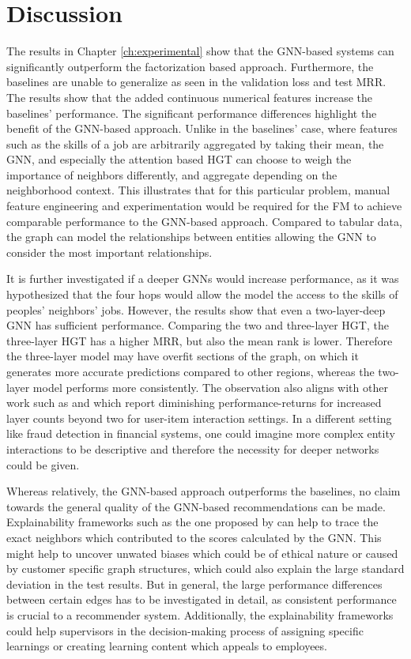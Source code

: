 
\chapter{Discussion}
\label{ch:discussion}
The results in Chapter \ref{ch:experimental} show that the GNN-based systems can significantly outperform the factorization based approach. Furthermore, the baselines are unable to generalize as seen in the validation loss and test MRR. The results show that the added continuous numerical features increase the baselines' performance. The significant performance differences highlight the benefit of the GNN-based approach. Unlike in the baselines' case, where features such as the skills of a job are arbitrarily aggregated by taking their mean, the GNN, and especially the attention based HGT can choose to weigh the importance of neighbors differently, and aggregate depending on the neighborhood context. This illustrates that for this particular problem, manual feature engineering and experimentation would be required for the FM to achieve comparable performance to the GNN-based approach. Compared to tabular data, the graph can model the relationships between entities allowing the GNN to consider the most important relationships. 

It is further investigated if a deeper GNNs would increase performance, as it was hypothesized that the four hops would allow the model the access to the skills of peoples' neighbors' jobs. However, the results show that even a two-layer-deep GNN has sufficient performance. Comparing the two and three-layer HGT, the three-layer HGT has a higher MRR, but also the mean rank is lower. Therefore the three-layer model may have overfit sections of the graph, on which it generates more accurate predictions compared to other regions, whereas the two-layer model performs more consistently. The observation also aligns with other work such as \parencite{ying2018graph} and \parencite{hamilton2017inductive} which report diminishing performance-returns for increased layer counts beyond two for user-item interaction settings. In a different setting like fraud detection in financial systems, one could imagine more complex entity interactions to be descriptive and therefore the necessity for deeper networks could be given. 

Whereas relatively, the GNN-based approach outperforms the baselines, no claim towards the general quality of the GNN-based recommendations can be made. Explainability frameworks such as the one proposed by \textcite{amara2022graphframex} can help to trace the exact neighbors which contributed to the scores calculated by the GNN. This might help to uncover unwated biases which could be of ethical nature or caused by customer specific graph structures, which could also explain the large standard deviation in the test results. But in general, the large performance differences between certain edges has to be investigated in detail, as consistent performance is crucial to a recommender system. Additionally, the explainability frameworks could help supervisors in the decision-making process of assigning specific learnings or creating learning content which appeals to employees. 

